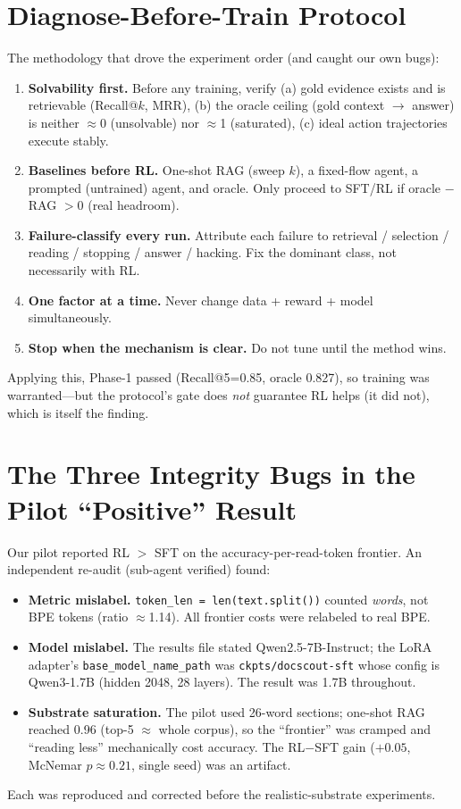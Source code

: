 \documentclass[10pt,twocolumn]{article}
\begin{document}
\section{Diagnose-Before-Train Protocol}
\label{app:protocol}
The methodology that drove the experiment order (and caught our own bugs):
\begin{enumerate}\itemsep0pt
\item \textbf{Solvability first.} Before any training, verify (a) gold evidence exists and is retrievable (Recall@$k$, MRR), (b) the oracle ceiling (gold context $\to$ answer) is neither $\approx$0 (unsolvable) nor $\approx$1 (saturated), (c) ideal action trajectories execute stably.
\item \textbf{Baselines before RL.} One-shot RAG (sweep $k$), a fixed-flow agent, a prompted (untrained) agent, and oracle. Only proceed to SFT/RL if oracle $-$ RAG $> 0$ (real headroom).
\item \textbf{Failure-classify every run.} Attribute each failure to retrieval / selection / reading / stopping / answer / hacking. Fix the dominant class, not necessarily with RL.
\item \textbf{One factor at a time.} Never change data + reward + model simultaneously.
\item \textbf{Stop when the mechanism is clear.} Do not tune until the method wins.
\end{enumerate}
Applying this, Phase-1 passed (Recall@5=0.85, oracle 0.827), so training was warranted---but the protocol's gate does \emph{not} guarantee RL helps (it did not), which is itself the finding.

\section{The Three Integrity Bugs in the Pilot ``Positive'' Result}
\label{app:audit}
Our pilot reported RL $>$ SFT on the accuracy-per-read-token frontier. An independent re-audit (sub-agent verified) found:
\begin{itemize}\itemsep0pt
\item \textbf{Metric mislabel.} \texttt{token\_len = len(text.split())} counted \emph{words}, not BPE tokens (ratio $\approx$1.14). All frontier costs were relabeled to real BPE.
\item \textbf{Model mislabel.} The results file stated Qwen2.5-7B-Instruct; the LoRA adapter's \texttt{base\_model\_name\_path} was \texttt{ckpts/docscout-sft} whose config is Qwen3-1.7B (hidden 2048, 28 layers). The result was 1.7B throughout.
\item \textbf{Substrate saturation.} The pilot used 26-word sections; one-shot RAG reached 0.96 (top-5 $\approx$ whole corpus), so the ``frontier'' was cramped and ``reading less'' mechanically cost accuracy. The RL$-$SFT gain ($+0.05$, McNemar $p{\approx}0.21$, single seed) was an artifact.
\end{itemize}
Each was reproduced and corrected before the realistic-substrate experiments.
\end{document}
